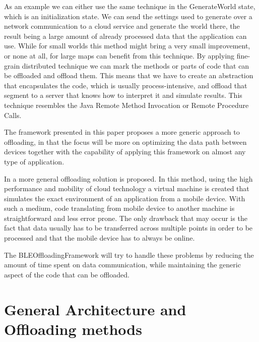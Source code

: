 \documentclass[twoside]{article}
\begin{document}
\begin{multicols}{2}
As an example we can either use the same technique in the GenerateWorld state, which is an initialization state. We can send the settings used to generate over a network communication to a cloud service and generate the world there, the result being a large amount of already processed data that the application can use. While for small worlds this method might bring a very small improvement, or none at all, for large maps can benefit from this technique. By applying fine-grain distributed technique we can mark the methods or parts of code that can be offloaded and offload them. This means that we have to create an abstraction that encapsulates the code, which is usually process-intensive, and offload that segment to a server that knows how to interpret it and simulate results. This technique resembles the Java Remote Method Invocation or Remote Procedure Calls.

The framework presented in this paper proposes a more generic approach to offloading, in that the focus will be more on optimizing the data path between devices together with the capability of applying this framework on almost any type of application.

In \cite{CloneCloud} a more general offloading solution is proposed. In this method, using the high performance and mobility of cloud technology a virtual machine is created that simulates the exact environment of an application from a mobile device. With such a medium, code translating from mobile device to another machine is straightforward and less error prone. The only drawback that may occur is the fact that data usually has to be transferred across multiple points in order to be processed and that the mobile device has to always be online.

The BLEOffloadingFramework will try to handle these problems by reducing the amount of time spent on data communication, while maintaining the generic aspect of the code that can be offloaded. 


\section{General Architecture and Offloading methods}
\label{architecture}


\end{multicols}
\end{document}

